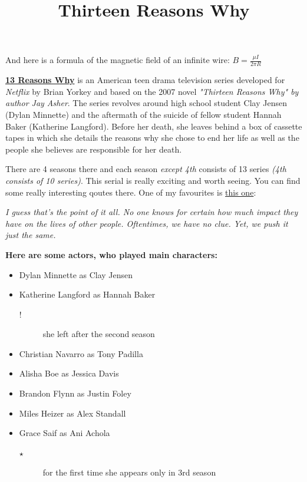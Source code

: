 And here is a formula of the magnetic field of an infinite wire:
$ B = \frac{\mu I}{2\pi R} $
    \begin{flushleft}    
    \begingroup
    \centering
    \title{\textbf{\Large Thirteen Reasons Why}}
    
    \endgroup
    \vspace{0.1cm}

    \setlength{\parindent}{1em}
    \underline{\textbf{13 Reasons Why}} is an American teen drama television series developed for \textit{Netflix} by Brian Yorkey and based on the 2007 novel \emph{"Thirteen Reasons Why" by author Jay Asher}. The series revolves around high school student Clay Jensen (Dylan Minnette) and the aftermath of the suicide of fellow student Hannah Baker (Katherine Langford). Before her death, she leaves behind a box of cassette tapes in which she details the reasons why she chose to end her life as well as the people she believes are responsible for her death. \par
    There are 4 seasons there and each season \emph{except 4th} consists of 13 series \emph{(4th consists of 10 series)}. This serial is really exciting and worth seeing. You can find some really interesting qoutes there. One of my favourites is \underline{this one}:
    
    \begingroup 
    \centering
    \textit{I guess that's the point of it all. No one knows for certain how much impact they have on the lives of other people. Oftentimes, we have no clue. Yet, we push it just the same.}
    
    \endgroup
 \end{flushleft}


\textbf{\large Here are some actors, who played main characters:}
\begin{itemize}
    \item Dylan Minnette as Clay Jensen
    \item Katherine Langford as Hannah Baker
    \begin{description}
        \item[!] she left after the second season
    \end{description}
    \item Christian Navarro as Tony Padilla
    \item Alisha Boe as Jessica Davis
    \item Brandon Flynn as Justin Foley
    \item Miles Heizer as Alex Standall
    \item Grace Saif as Ani Achola
    \begin{description}
        \item[$\star$] for the first time she appears only in 3rd season 
    \end{description}
\end{itemize}

